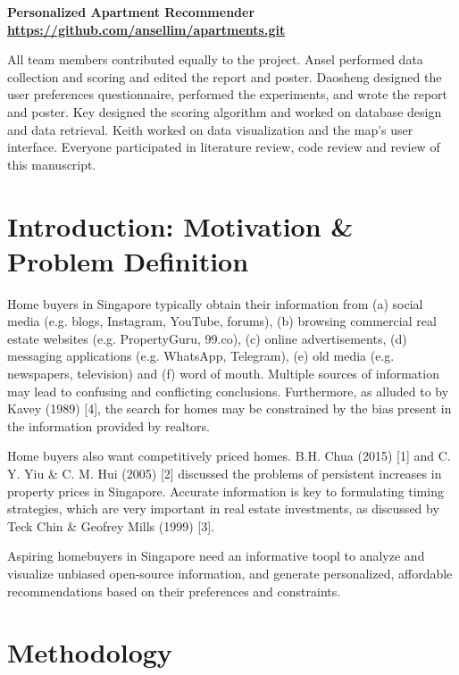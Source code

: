 \documentclass[a4paper, 11pt]{article}
\begin{document}
	\begin{center}
		\sc\large\textbf{Personalized Apartment Recommender \\
\url{https://github.com/ansellim/apartments.git}}\\
	\end{center}

{All team members contributed equally to the project. Ansel performed data collection and scoring and edited the report and poster. Daosheng designed the user preferences questionnaire, performed the experiments, and wrote the report and poster. Key designed the scoring algorithm and worked on database design and data retrieval. Keith worked on data visualization and the map's user interface. Everyone participated in literature review, code review and review of this manuscript.}

	\section{Introduction: Motivation \& Problem Definition}

	Home buyers in Singapore typically obtain their information from (a) social media (e.g. blogs, Instagram, YouTube, forums), (b) browsing commercial real estate websites (e.g. PropertyGuru, 99.co), (c) online advertisements, (d) messaging applications (e.g. WhatsApp, Telegram), (e) old media (e.g. newspapers, television) and (f) word of mouth. Multiple sources of information may lead to confusing and conflicting conclusions. Furthermore, as alluded to by Kavey (1989) [4], the search for homes may be constrained by the bias present in the information provided by realtors.

	Home buyers also want competitively priced homes. B.H. Chua (2015) [1] and C. Y. Yiu \& C. M. Hui (2005) [2] discussed the problems of persistent increases in property prices in Singapore. Accurate information is key to formulating timing strategies, which are very important in real estate investments, as discussed by Teck Chin \& Geofrey Mills (1999) [3].

 Aspiring homebuyers in Singapore need an informative toopl to analyze and visualize unbiased open-source information, and generate personalized, affordable recommendations based on their preferences and constraints.

	\section{Methodology}
\end{document}
